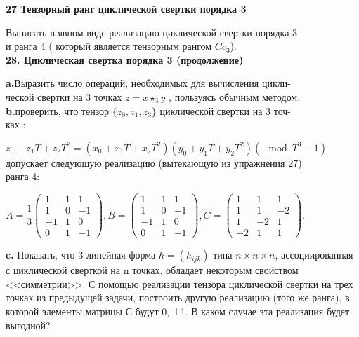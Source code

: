 \documentclass{mai_book}
\begin{document}
\noindent\textbf{27 \quad Тензорный ранг циклической свертки порядка 3}

\medskip
\indent Выписать в явном виде реализацию циклической свертки порядка 3 \\ и ранга 4 ( который является тензорным рангом $Cc_3$).\\

\noindent\textbf{28. \quad Циклическая свертка порядка 3 (продолжение)}

\medskip
\textbf{a.}\quad Выразить число операций, необходимых для вычисления цикли-\\ческой свертки на 3 точках $z = x \star_3 y$ , пользуясь обычным методом. \\
\indent \textbf{b.}\quad проверить, что тензор $\{z_0, z_1, z_3\}$ циклической свертки на 3 точ-\\ках :

$z_0 + z_1T + z_2T^2 = (x_0 + x_1T + x_2T^2)(y_0 + y_1T + y_2T^2)(\mod T^3 - 1)$ \\

\noindent допускает следующую реализацию (вытекающую из упражнения 27)\\ ранга 4:
\begin{center}
$ A = \dfrac{1}{3}\begin{pmatrix}
    1 & 1&1\\
    1&0&-1\\
    -1&1&0\\
    0&1&-1
    \end{pmatrix}, B = \begin{pmatrix}
    1 & 1&1\\
    1&0&-1\\
    -1&1&0\\
    0&1&-1
    \end{pmatrix}, C = \begin{pmatrix}
    1 & 1&1\\
    1&1&-2\\
    1&-2&1\\
    -2&1&1
    \end{pmatrix}.$
\end{center}

\textbf{c.} Показать, что 3-линейная форма $h=(h_{ijk})$ типа $n \times n \times n$,  ассоциированная с циклической сверткой на n точках, обладает некоторым свойством <<симметрии>>. С помощью реализации тензора циклической свертки на трех точках из предыдущей задачи, построить другую   реализацию (того же ранга), в которой элементы матрицы С будут 0, ±1. В каком случае эта реализация будет выгодной?
\end{document}
